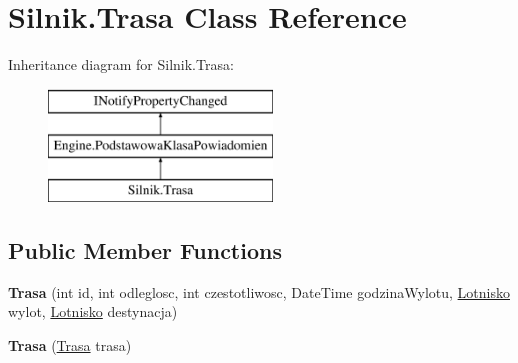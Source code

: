 \hypertarget{class_silnik_1_1_trasa}{}\section{Silnik.\+Trasa Class Reference}
\label{class_silnik_1_1_trasa}
Inheritance diagram for Silnik.\+Trasa\+:\begin{figure}[H]
\begin{center}
\leavevmode
\includegraphics[height=3.000000cm]{class_silnik_1_1_trasa}
\end{center}
\end{figure}
\subsection*{Public Member Functions}
\begin{DoxyCompactItemize}
\item 
\mbox{\label{class_silnik_1_1_trasa_aee3f0dcb8446e12b5c3fa3b227fae31e}} 
{\bfseries Trasa} (int id, int odleglosc, int czestotliwosc, Date\+Time godzina\+Wylotu, \mbox{\hyperlink{class_silnik_1_1_lotnisko}{Lotnisko}} wylot, \mbox{\hyperlink{class_silnik_1_1_lotnisko}{Lotnisko}} destynacja)
\item 
\mbox{\label{class_silnik_1_1_trasa_af49526eb2f9a0aa459a364ccd6f87eb8}} 
{\bfseries Trasa} (\mbox{\hyperlink{class_silnik_1_1_trasa}{Trasa}} trasa)
\end{DoxyCompactItemize}
